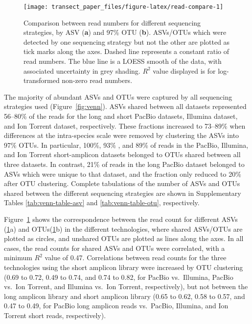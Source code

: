 \documentclass[
  12pt,
]{article}
\begin{document}
\begin{figure}

{\centering \texttt{[image: transect\_paper\_files/figure-latex/read-compare-1]} 

}

\caption[Comparison between read numbers for different sequencing strategies]{Comparison between read numbers for different sequencing strategies, by ASV (\textbf{a}) and 97\% OTU (\textbf{b}). ASVs/OTUs which were detected by one sequencing strategy but not the other are plotted as tick marks along the axes. Dashed line represents a constant ratio of read numbers. The blue line is a LOESS smooth of the data, with associated uncertainty in grey shading. \(R^2\) value displayed is for log-transformed non-zero read numbers.}\label{fig:read-compare}
\end{figure}

The majority of abundant ASVs and OTUs were captured by all sequencing strategies used (Figure~\ref{fig:venn}).
ASVs shared between all datasets represented 56--80\% of the reads for the long and short PacBio datasets, Illumina dataset, and Ion Torrent dataset, respectively.
These fractions increased to 73--89\% when differences at the intra-species scale were removed by clustering the ASVs into 97\% OTUs.
In particular, 100\%, 93\% , and 89\% of reads in the PacBio, Illumina, and Ion Torrent short-amplicon datasets belonged to OTUs shared between all three datasets.
In contrast, 21\% of reads in the long PacBio dataset belonged to ASVs which were unique to that dataset, and the fraction only reduced to 20\% after OTU clustering.
Complete tabulations of the number of ASVs and OTUs shared between the different sequencing strategies are shown in Supplementary Tables \ref{tab:venn-table-asv} and \ref{tab:venn-table-otu}, respectively.

Figure~\ref{fig:read-compare} shows the correspondence between the read count for different ASVs (\ref{fig:read-compare}a) and OTUs(\ref{fig:read-compare}b) in the different technologies, where shared ASVs/OTUs are plotted as circles, and unshared OTUs are plotted as lines along the axes.
In all cases, the read counts for shared ASVs and OTUs were correlated, with a minimum \(R^2\) value of 0.47.
Correlations between read counts for the three technologies using the short amplicon library were increased by OTU clustering
(0.69 to 0.72,
0.49 to 0.74, and
0.74 to 0.82,
for PacBio vs.~Illumina, PacBio vs.~Ion Torrent, and Illumina vs.~Ion Torrent, respectively), but not between the long amplicon library and short amplicon library
(0.65 to 0.62,
0.58 to 0.57, and
0.47 to 0.49, for PacBio long amplicon reads vs.~PacBio, Illumina, and Ion Torrent short reads, respectively).
\end{document}
